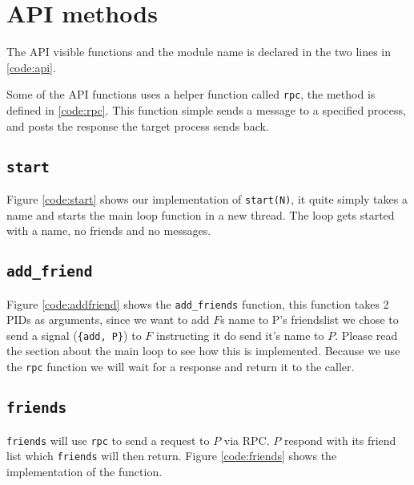\section{API methods}

The API visible functions and the module name is declared in the two lines in
\ref{code:api}.


Some of the API functions uses a helper function called \texttt{rpc}, the method
is defined in \ref{code:rpc}. This function simple sends a message to a
specified process, and posts the response the target process sends back.


\subsection{\texttt{start}}
  Figure
\ref{code:start} shows our implementation of \texttt{start(N)}, it quite simply
takes a name and starts the main loop function in a new thread. The loop gets
started with a name, no friends and no messages.

\subsection{\texttt{add\_friend}}
\label{api:add_friend}


Figure \ref{code:addfriend} shows the \texttt{add\_friends} function, this
function takes 2 PIDs as arguments, since we want to add $F$s name to P's
friendslist we chose to send a signal (\texttt{\{add, P\}}) to $F$ instructing
it do send it's name to $P$. Please read the section about the main loop to see
how this is implemented. Because we use the \texttt{rpc} function we will wait
for a response and return it to the caller.

\subsection{\texttt{friends}}

\texttt{friends} will use \texttt{rpc} to send a request to $P$ via RPC. $P$
respond with its friend list which \texttt{friends} will then return. Figure
\ref{code:friends} shows the implementation of the function.

